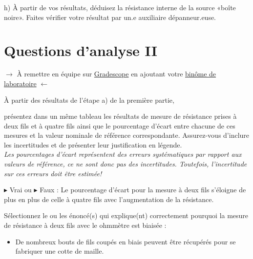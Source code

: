 \documentclass[canadien,12pt,oneside,letterpaper]{article}
\begin{document}
h) À partir de vos résultats, déduisez la résistance interne de la source «boîte noire». Faites vérifier votre résultat par un.e auxiliaire dépanneur.euse.


\section{Questions d'analyse II} \label{sec:grade}
\vspace{-0.5cm}
\noindent$\rightarrow$ À remettre en équipe sur \href{https://www.gradescope.com/}{Gradescope} en ajoutant votre \href{https://help.gradescope.com/article/m5qz2xsnjy-student-add-group-members}{binôme de laboratoire} $\leftarrow$

\begin{gradescope}
\item À partir des résultats de l'étape a) de la première partie,
    \begin{gradescope}
    \item présentez dans un même tableau les résultats de mesure de résistance prises à deux fils et à quatre fils ainsi que le pourcentage d'écart entre chacune de ces mesures et la valeur nominale de référence correspondante. Assurez-vous d'inclure les incertitudes et de présenter leur justification en légende.\\\textit{\footnotesize Les pourcentages d'écart représentent des erreurs systématiques par rapport aux valeurs de référence, ce ne sont donc pas des incertitudes. Toutefois, l'incertitude sur ces erreurs doit être estimée!}
    \item $\blacktriangleright$ Vrai ou $\blacktriangleright$ Faux : Le pourcentage d'écart pour la mesure à deux fils s'éloigne de plus en plus de celle à quatre fils avec l'augmentation de la résistance.
    \item Sélectionnez le ou les énoncé(s) qui explique(nt) correctement pourquoi la mesure de résistance à deux fils avec le ohmmètre est biaisée :
    \begin{itemize}[label=$\blacktriangleright$]
    \item De nombreux bouts de fils coupés en biais peuvent être récupérés pour se fabriquer une cotte de maille.

\end{itemize}
\end{gradescope}
\end{gradescope}
\end{document}
